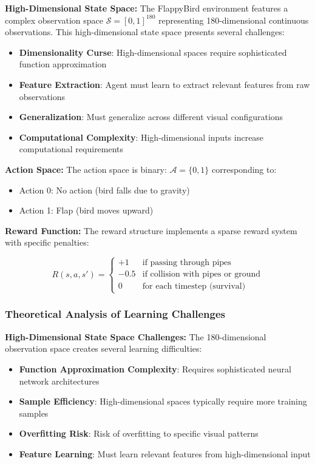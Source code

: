 \documentclass[12pt]{article}
\begin{document}
{{{\textbf{High-Dimensional State Space:}
The FlappyBird environment features a complex observation space $\mathcal{S} = [0,1]^{180}$ representing 180-dimensional continuous observations. This high-dimensional state space presents several challenges:

\begin{itemize}
    \item \textbf{Dimensionality Curse}: High-dimensional spaces require sophisticated function approximation
    \item \textbf{Feature Extraction}: Agent must learn to extract relevant features from raw observations
    \item \textbf{Generalization}: Must generalize across different visual configurations
    \item \textbf{Computational Complexity}: High-dimensional inputs increase computational requirements
\end{itemize}

\textbf{Action Space:}
The action space is binary: $\mathcal{A} = \{0, 1\}$ corresponding to:
\begin{itemize}
    \item Action 0: No action (bird falls due to gravity)
    \item Action 1: Flap (bird moves upward)
\end{itemize}

\textbf{Reward Function:}
The reward structure implements a sparse reward system with specific penalties:

\begin{equation}
R(s,a,s') = \begin{cases}
+1 & \text{if passing through pipes} \\
-0.5 & \text{if collision with pipes or ground} \\
0 & \text{for each timestep (survival)}
\end{cases}
\end{equation}

\subsubsection{Theoretical Analysis of Learning Challenges}

\textbf{High-Dimensional State Space Challenges:}
The 180-dimensional observation space creates several learning difficulties:

\begin{itemize}
    \item \textbf{Function Approximation Complexity}: Requires sophisticated neural network architectures
    \item \textbf{Sample Efficiency}: High-dimensional spaces typically require more training samples
    \item \textbf{Overfitting Risk}: Risk of overfitting to specific visual patterns
    \item \textbf{Feature Learning}: Must learn relevant features from high-dimensional input
\end{itemize}

}}}
\end{document}
